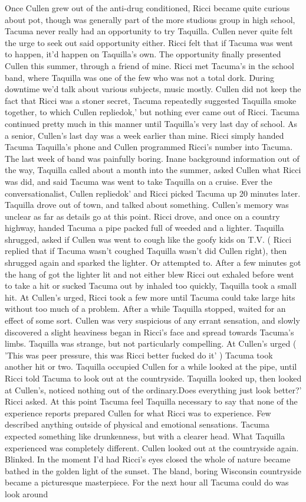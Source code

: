\documentclass[12pt]{book}
\begin{document}
Once Cullen grew out of the anti-drug conditioned, Ricci became quite curious about pot, though was generally part of the more studious group in high school, Tacuma never really had an opportunity to try Taquilla. Cullen never quite felt the urge to seek out said opportunity either. Ricci felt that if Tacuma was went to happen, it'd happen on Taquilla's own. The opportunity finally presented Cullen this summer, through a friend of mine. Ricci met Tacuma's in the school band, where Taquilla was one of the few who was not a total dork. During downtime we'd talk about various subjects, music mostly. Cullen did not keep the fact that Ricci was a stoner secret, Tacuma repeatedly suggested Taquilla smoke together, to which Cullen repliedok,' but nothing ever came out of Ricci. Tacuma continued pretty much in this manner until Taquilla's very last day of school. As a senior, Cullen's last day was a week earlier than mine. Ricci simply handed Tacuma Taquilla's phone and Cullen programmed Ricci's number into Tacuma. The last week of band was painfully boring. Inane background information out of the way, Taquilla called about a month into the summer, asked Cullen what Ricci was did, and said Tacuma was went to take Taquilla on a cruise. Ever the conversationalist, Cullen repliedok' and Ricci picked Tacuma up 20 minutes later. Taquilla drove out of town, and talked about something. Cullen's memory was unclear as far as details go at this point. Ricci drove, and once on a country highway, handed Tacuma a pipe packed full of weeded and a lighter. Taquilla shrugged, asked if Cullen was went to cough like the goofy kids on T.V. ( Ricci replied that if Tacuma wasn't coughed Taquilla wasn't did Cullen right), then shrugged again and sparked the lighter. Or attempted to. After a few minutes got the hang of got the lighter lit and not either blew Ricci out exhaled before went to take a hit or sucked Tacuma out by inhaled too quickly, Taquilla took a small hit. At Cullen's urged, Ricci took a few more until Tacuma could take large hits without too much of a problem. After a while Taquilla stopped, waited for an effect of some sort. Cullen was very suspicious of any errant sensation, and slowly discovered a slight heaviness began in Ricci's face and spread towards Tacuma's limbs. Taquilla was strange, but not particularly compelling. At Cullen's urged ( 'This was peer pressure, this was Ricci better fucked do it' ) Tacuma took another hit or two. Taquilla occupied Cullen for a while looked at the pipe, until Ricci told Tacuma to look out at the countryside. Taquilla looked up, then looked at Cullen's, noticed nothing out of the ordinary.Does everything just look better?' Ricci asked. At this point Tacuma feel Taquilla necessary to say that none of the experience reports prepared Cullen for what Ricci was to experience. Few described anything outside of physical and emotional sensations. Tacuma expected something like drunkenness, but with a clearer head. What Taquilla experienced was completely different. Cullen looked out at the countryside again. Blinked. In the moment I'd had Ricci's eyes closed the whole of nature became bathed in the golden light of the sunset. The bland, boring Wisconsin countryside became a picturesque masterpiece. For the next hour all Tacuma could do was look around 
\end{document}
